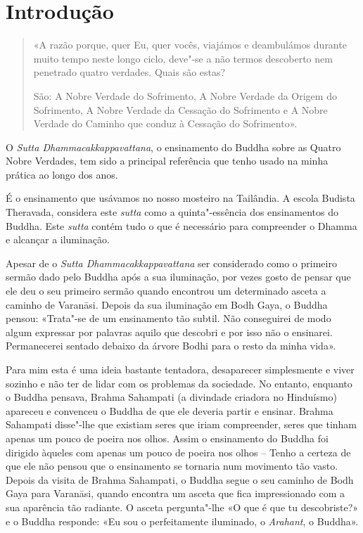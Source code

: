 \chapter{Introdução}

\thispagestyle{bottomcenter}

\begin{quote}
  «A razão porque, quer Eu, quer vocês, viajámos e deambulámos durante muito
  tempo neste longo ciclo, deve"-se a não termos descoberto nem penetrado quatro
  verdades. Quais são estas?

  São: A Nobre Verdade do Sofrimento, A Nobre Verdade da Origem do Sofrimento, A
  Nobre Verdade da Cessação do Sofrimento e A Nobre Verdade do Caminho que conduz
  à Cessação do Sofrimento».

\end{quote}

\noindent
O \emph{Sutta Dhammacakkappavattana}, o ensinamento do Buddha sobre as Quatro
Nobre Verdades, tem sido a principal referência que tenho usado na minha prática
ao longo dos anos.

\enlargethispage{\baselineskip}

É o ensinamento que usávamos no nosso mosteiro na Tailândia.
A escola Budista Theravada, considera este \emph{sutta} como a quinta"-essência
dos ensinamentos do Buddha. Este \emph{sutta} contém tudo o que é necessário
para compreender o Dhamma e alcançar a iluminação.

Apesar de o \emph{Sutta Dhammacakkappavattana} ser considerado como o primeiro
sermão dado pelo Buddha após a sua iluminação, por vezes gosto de pensar que ele
deu o seu primeiro sermão quando encontrou um determinado asceta a caminho de Varanāsi.
Depois da sua iluminação em Bodh Gaya, o Buddha pensou: «Trata"-se de um
ensinamento tão subtil. Não conseguirei de modo algum expressar por palavras
aquilo que descobri e por isso não o ensinarei. Permanecerei sentado debaixo da
árvore Bodhi para o resto da minha vida».

Para mim esta é uma ideia bastante tentadora, desaparecer simplesmente e viver
sozinho e não ter de lidar com os problemas da sociedade. No entanto, enquanto o
Buddha pensava, Brahma Sahampati (a divindade criadora no Hinduísmo) apareceu e
convenceu o Buddha de que ele deveria partir e ensinar. Brahma Sahampati
disse"-lhe que existiam seres que iriam compreender, seres que tinham apenas um pouco
de poeira nos olhos. Assim o ensinamento do Buddha foi dirigido àqueles com apenas um
pouco de poeira nos olhos – Tenho a certeza de que ele não pensou que o
ensinamento se tornaria num movimento tão vasto.
Depois da visita de Brahma Sahampati, o Buddha segue o seu caminho de Bodh Gaya
para Varanāsi, quando encontra um asceta que fica impressionado com a sua
aparência tão radiante. O asceta pergunta"-lhe «O que é que tu descobriste?» e o
Buddha responde: «Eu sou o perfeitamente iluminado, o \emph{Arahant}, o Buddha».

